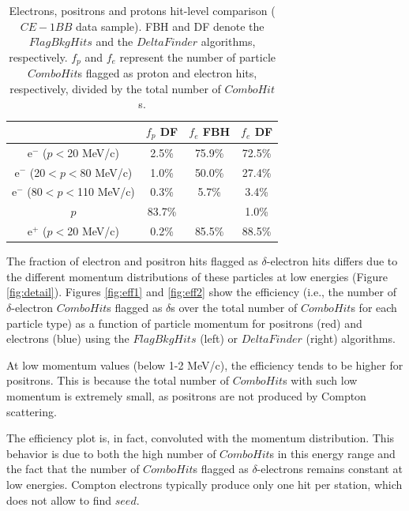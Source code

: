     \begin{center}
    \begin{table}[h!]
    \centering
    \renewcommand{\arraystretch}{1.}
    \begin{tabular}{| c | c | c | c |} 
    \hline
   &  $f_{p}$ DF & $f_{e}$ FBH  & $f_{e}$ DF \\
    \hline
    e$^-$ ($p<$20 MeV/c)     & 2.5\%   & 75.9\% & 72.5\%\\
    \hline
    e$^-$ (20$<p<$80 MeV/c)  & 1.0\%   & 50.0\%& 27.4\%\\
    \hline
    e$^-$ (80$<p<$110 MeV/c)   & 0.3\%  &  5.7\%& 3.4\%\\
    \hline
    $p$                 &         83.7\%   &  & 1.0\%\\
    \hline
    e$^+$ ($p<$20 MeV/c)    & 0.2\%    &   85.5\%& 88.5\%\\
    \hline
    \end{tabular}
    \caption{Electrons, 
    positrons and protons hit-level 
    comparison ($CE-1BB$ data sample). 
    FBH and DF denote the $FlagBkgHits$
    and the $DeltaFinder$ 
    algorithms, respectively. $f_p$ and 
    $f_e$ represent 
    the number of particle $ComboHit$s 
    flagged as proton and electron hits, respectively, 
    divided by the total number of $ComboHit$s.}
    \label{tab:1bbcele}
    \end{table}
  \end{center}

  
The fraction of electron and positron hits 
flagged as $\delta$-electron hits  
differs due to the different momentum distributions  
of these particles at low energies 
(Figure \ref{fig:detail}). Figures \ref{fig:eff1} and 
\ref{fig:eff2} 
show the efficiency 
(i.e., the number of $\delta$-electron 
$ComboHit$s flagged as $\delta$s 
over the total number of $ComboHit$s 
for each particle type) as a function 
of particle momentum for positrons (red) 
and electrons (blue) using the 
$FlagBkgHits$ (left) or $DeltaFinder$ 
(right) algorithms. 

At low momentum values (below 1-2 MeV/c), 
the efficiency 
tends to be higher for positrons. 
This is because the 
total number of $ComboHit$s with 
such low momentum is extremely 
small, as positrons are not produced by  
Compton scattering.

The efficiency plot is, in fact, 
convoluted with the momentum 
distribution. This behavior is due 
to both the high number of 
$ComboHit$s in this energy range and 
the fact that the number 
of $ComboHit$s flagged as 
$\delta$-electrons remains constant 
at low energies. Compton electrons 
typically produce only 
one hit per station, which does not allow to 
find $seed$. 

